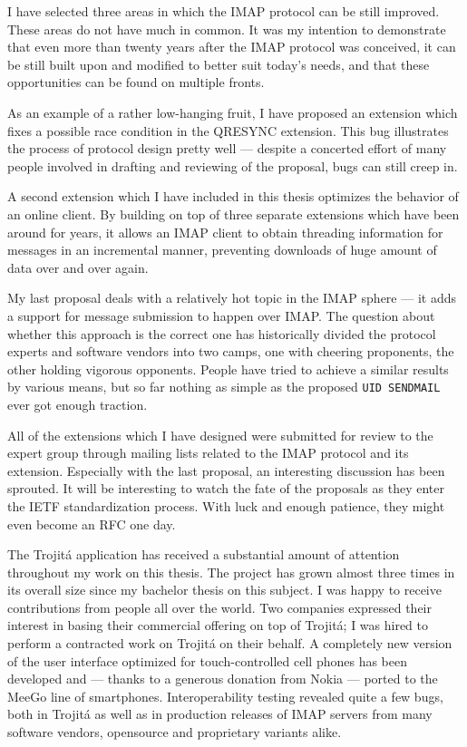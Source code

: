 \documentclass[trojita]{subfiles}
\begin{document}
I have selected three areas in which the IMAP protocol can be still improved.  These areas do not have much in common.
It was my intention to demonstrate that even more than twenty years after the IMAP protocol was conceived, it can be
still built upon and modified to better suit today's needs, and that these opportunities can be found on multiple
fronts.

As an example of a rather low-hanging fruit, I have proposed an extension which fixes a possible race condition in the
QRESYNC extension.  This bug illustrates the process of protocol design pretty well --- despite a concerted effort of
many people involved in drafting and reviewing of the proposal, bugs can still creep in.

A second extension which I have included in this thesis optimizes the behavior of an online client.  By building on top
of three separate extensions which have been around for years, it allows an IMAP client to obtain threading information
for messages in an incremental manner, preventing downloads of huge amount of data over and over again.

My last proposal deals with a relatively hot topic in the IMAP sphere --- it adds a support for message submission to
happen over IMAP.  The question about whether this approach is the correct one has historically divided the protocol
experts and software vendors into two camps, one with cheering proponents, the other holding vigorous opponents.  People
have tried to achieve a similar results by various means, but so far nothing as simple as the proposed {\tt UID
SENDMAIL} ever got enough traction.

All of the extensions which I have designed were submitted for review to the expert group through mailing lists related
to the IMAP protocol and its extension.  Especially with the last proposal, an interesting discussion has been sprouted.
It will be interesting to watch the fate of the proposals as they enter the IETF standardization process.  With luck and
enough patience, they might even become an RFC one day.

The Trojitá application has received a substantial amount of attention throughout my work on this thesis.  The project
has grown almost three times in its overall size since my bachelor thesis on this subject.  I was happy to receive
contributions from people all over the world.  Two companies expressed their interest in basing their commercial
offering on top of Trojitá; I was hired to perform a contracted work on Trojitá on their behalf.  A completely new
version of the user interface optimized for touch-controlled cell phones has been developed and --- thanks to a generous
donation from Nokia --- ported to the MeeGo line of smartphones.  Interoperability testing revealed quite a few bugs,
both in Trojitá as well as in production releases of IMAP servers from many software vendors, opensource and proprietary
variants alike.
\end{document}
